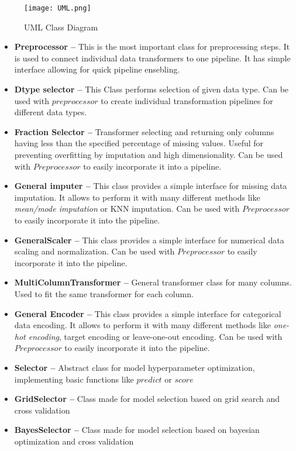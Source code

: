 \documentclass[a4paper,twoside,12pt]{book}
\begin{document}
\begin{figure}[!htb]
    \centering
    \texttt{[image: UML.png]}
    \caption{UML Class Diagram}
    \label{fig:uml}
\end{figure}
\newpage
\begin{itemize}
    \item \textbf{Preprocessor --} This is the most important class for preprocessing steps. It is used to connect individual data transformers to one pipeline. It has simple interface allowing for quick pipeline ensebling.
    
    \item \textbf{Dtype selector -- } This Class performs selection of given data type. Can be used with $preprocessor$ to create individual transformation pipelines for different data types.
    
    \item \textbf{Fraction Selector --}  Transformer selecting and returning only columns having less than the specified percentage of missing values. Useful for preventing overfitting by imputation and high dimensionality. Can be used with $Preprocessor$ to easily incorporate it into a pipeline.
    
    \item \textbf{General imputer --} This class provides a simple interface for missing data imputation. It allows to perform it with many different methods like \emph{mean/mode imputation} or {KNN imputation}. Can be used with $Preprocessor$ to easily incorporate it into the pipeline.
    
    \item \textbf{GeneralScaler --}  This class provides a simple interface for numerical data scaling and normalization. Can be used with $Preprocessor$ to easily incorporate it into the pipeline.
    
    \item \textbf{MultiColumnTransformer --}  General transformer class for many columns. Used to fit the same transformer for each column.
    
    \item \textbf{General Encoder --}  This class provides a simple interface for categorical data encoding. It allows to perform it with many different methods like \emph{one-hot encoding}, {target encoding} or {leave-one-out encoding}. Can be used with $Preprocessor$ to easily incorporate it into the pipeline.
    
    \item \textbf{Selector --}  Abstract class for model hyperparameter optimization, implementing basic functions like $predict$ or $score$
    
    \item \textbf{GridSelector --}  Class made for model selection based on grid search and cross validation
    
    \item \textbf{BayesSelector --}  Class made for model selection based on bayesian optimization and cross validation
\end{itemize}
\end{document}

